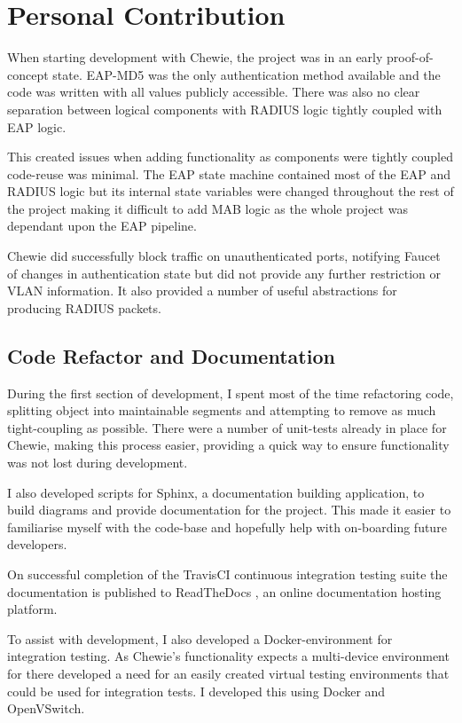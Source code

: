 \chapter{Personal Contribution}
When starting development with Chewie, the project was in an early proof-of-concept state. EAP-MD5 was the only authentication method available and the code was written with all values publicly accessible. There was also no clear separation between logical components with RADIUS logic tightly coupled with EAP logic.

This created issues when adding functionality as components were tightly coupled code-reuse was minimal. The EAP state machine contained most of the EAP and RADIUS logic but its internal state variables were changed throughout the rest of the project making it difficult to add MAB logic as the whole project was dependant upon the EAP pipeline. 

Chewie did successfully block traffic on unauthenticated ports, notifying Faucet of changes in authentication state but did not provide any further restriction or VLAN information. It also provided a number of useful abstractions for producing RADIUS packets.

\section{Code Refactor and Documentation}
During the first section of development, I spent most of the time refactoring code, splitting object into maintainable segments and attempting to remove as much tight-coupling as possible. 
There were a number of unit-tests already in place for Chewie, making this process easier, providing a quick way to ensure functionality was not lost during development.

I also developed scripts for Sphinx\cite{sphinx_homepage}, a documentation building application, to build diagrams and provide documentation for the project. This made it easier to familiarise myself with the code-base and hopefully help with on-boarding future developers. 

On successful completion of the TravisCI\cite{travis_ci_homepage} continuous integration testing suite the documentation is published to ReadTheDocs \cite{chewie_read_the_docs}, an online documentation hosting platform.

To assist with development, I also developed a Docker-environment for integration testing. 
As Chewie's functionality expects a multi-device environment for there developed a need for an easily created virtual testing environments that could be used for integration tests. 
I developed this using Docker\cite{docker_homepage} and OpenVSwitch\cite{openvswitch}. 

